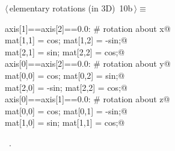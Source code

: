 \documentclass[11pt,oneside]{article}	%
\begin{document}
\begin{flushleft} \small \label{scrap24}
\protect{}$\langle\,$elementary rotations (in 3D)\nobreak\ {\footnotesize 10b}$\,\rangle\equiv$
\vspace{-1ex}
\begin{list}{}{} \item
\mbox{}\verb@if axis[1]==axis[2]==0.0:  # rotation about x@\\
\mbox{}\verb@   mat[1,1] = cos;   mat[1,2] = -sin;@\\
\mbox{}\verb@   mat[2,1] = sin;   mat[2,2] = cos;@\\
\mbox{}\verb@elif axis[0]==axis[2]==0.0:   # rotation about y@\\
\mbox{}\verb@   mat[0,0] = cos;   mat[0,2] = sin;@\\
\mbox{}\verb@   mat[2,0] = -sin;  mat[2,2] = cos;@\\
\mbox{}\verb@elif axis[0]==axis[1]==0.0:   # rotation about z@\\
\mbox{}\verb@   mat[0,0] = cos;   mat[0,1] = -sin;@\\
\mbox{}\verb@   mat[1,0] = sin;   mat[1,1] = cos;@\\
\mbox{}\verb@@{\NWsep}
\end{list}
\vspace{-1ex}
\footnotesize\addtolength{\baselineskip}{-1ex}
\begin{list}{}{\setlength{\itemsep}{-\parsep}\setlength{\itemindent}{-\leftmargin}}
\item \NWtxtMacroRefIn\ .
\end{list}
\end{flushleft}
\end{document}

